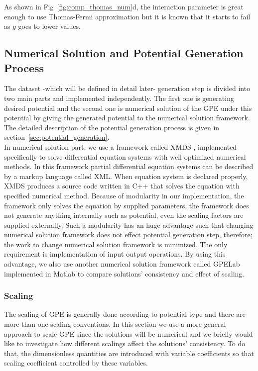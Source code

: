 \documentclass[a4paper,times,hidelinks,12pt]{article}
\begin{document}
As shown in Fig~\ref{fig:comp_thomas_num}d, the interaction parameter is great enough to use Thomas-Fermi approximation but it is known that it starts to fail as $g$ goes to lower values.

\subsection{Numerical Solution and Potential Generation Process}

The dataset -which will be defined in detail later- generation step is divided into two main parts and implemented independently. The first one is generating desired potential and the second one is numerical solution of the GPE under this potential by giving the generated potential to the numerical solution framework. The detailed description of the potential generation process is given in section~\ref{sec:potential_generation}. \\

In numerical solution part, we use a framework called XMDS \cite{dennis2013xmds2}, implemented specifically to solve differential equation systems with well optimized numerical methods. In this framework partial differential equation systems can be described by a markup language called XML.  When equation system is declared properly, XMDS produces a source code written in C++ that solves the equation with specified numerical method. Because of modularity in our implementation, the framework only solves the equation by supplied parameters, the framework does not generate anything internally such as potential, even the scaling factors are supplied externally. Such a modularity has an huge advantage such that changing numerical solution framework does not effect potential generation step, therefore; the work to change numerical solution framework is minimized. The only requirement is implementation of input output operations. By using this advantage, we also use another numerical solution framework called GPELab \cite{antoine2014gpelab} implemented in Matlab to compare solutions' consistency and effect of scaling.


\subsubsection{Scaling}

The scaling of GPE is generally done according to potential type and there are more than one scaling conventions. In this section we use a more general approach to scale GPE since the solutions will be numerical and we briefly would like to investigate how different scalings affect the solutions' consistency. To do that, the dimensionless quantities are introduced with variable coefficients so that scaling coefficient controlled by these variables. 
\end{document}
